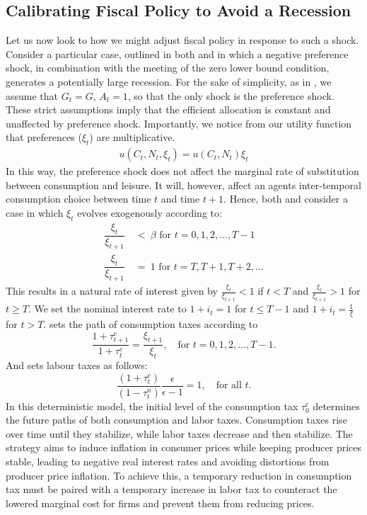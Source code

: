 \documentclass[11pt]{article}
\newcommand{\bb}{\bigbreak\noindent}
\begin{document}
\begin{spacing}{2}
\subsection{Calibrating Fiscal Policy to Avoid a Recession}
Let us now look to how we might adjust fiscal policy in response to such a shock. Consider a particular case, outlined in both \cite{eggertsson2011fiscal} and \cite{christiano2011government}  in which a negative preference shock, in combination with the meeting of the zero lower bound condition, generates a potentially large recession. For the sake of simplicity, as in  \cite{correia2013unconventional}, we assume that $G_t = G$, $A_t = 1$, so that the only shock is the preference shock. These strict assumptions imply that the efficient allocation is constant and unaffected by preference shock. Importantly, we notice from our utility function that preferences ($\xi_t$) are multiplicative. 
\begin{align}
	u(C_t, N_t, \xi_t) = u(C_t, N_t)\xi_t
\end{align}
In this way, the preference shock does not affect the marginal rate of substitution between consumption and leisure. It will, however, affect an agents inter-temporal consumption choice between time $t$ and time $t + 1$. 
Hence, both \cite{eggertsson2011fiscal} and \cite{christiano2011government} consider a case in which $\xi_t$ evolves exogenously according to: 
\begin{align*}
	\dfrac{\xi_t}{\xi_{t+1}} \: &< \: \beta \text{  for  } t = 0,1,2, \dots,T-1\\
	\dfrac{\xi_t}{\xi_{t+1}} \: &= \: 1 \text{  for  } t = T,T+1,T+2, \dots
\end{align*} 
This results in a natural rate of interest given by \(\frac{\xi_t}{\xi_{t+1}} < 1\) if \(t < T\) and \(\frac{\xi_t}{\xi_{t+1}} > 1\) for \(t \geq T\). We set the nominal interest rate to \(1 + i_t = 1\) for \(t \leq T - 1\) and \(1 + i_t = \frac{1}{\xi}\) for \(t > T\). \cite{correia2013unconventional} sets the path of consumption taxes according to
\[
\frac{1 + \tau_{t+1}^c}{1 + \tau_t^c} = \frac{\xi_{t+1}}{\xi_t}, \quad \text{for } t = 0, 1, 2, \dots, T - 1.
\]
And sets labour taxes as follows:
\[
\dfrac{(1 + \tau_t^c)}{(1 - \tau_t^n)} \frac{\epsilon}{\epsilon - 1} = 1, \quad \text{for all } t.
\]
\bb
In this deterministic model, the initial level of the consumption tax \(\tau_0^c\) determines the future paths of both consumption and labor taxes. Consumption taxes rise over time until they stabilize, while labor taxes decrease and then stabilize. The strategy aims to induce inflation in consumer prices while keeping producer prices stable, leading to negative real interest rates and avoiding distortions from producer price inflation. To achieve this, a temporary reduction in consumption tax must be paired with a temporary increase in labor tax to counteract the lowered marginal cost for firms and prevent them from reducing prices. 

\end{spacing}
\end{document}

